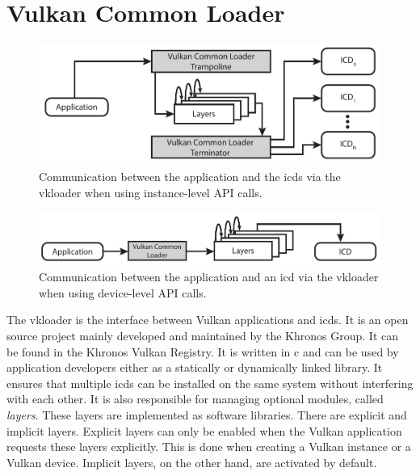   \section{Vulkan Common Loader}
  \label{sec:VulkanLoader}

    \begin{figure}
      \includegraphics{Main/Images/VulkanLoaderInstanceLayers}
      \centering
      \caption{Communication between the application and the \glspl{icd} via the \gls{vkloader} when using instance-level API calls.}
      \label{fig:VulkanLoaderWithInstanceLayers}
    \end{figure}

    \begin{figure}
      \includegraphics{Main/Images/VulkanLoaderDeviceLayers}
      \centering
      \caption{Communication between the application and an \gls{icd} via the \gls{vkloader} when using device-level API calls.}
      \label{fig:VulkanLoaderWithDeviceLayers}
    \end{figure}

    The \gls{vkloader} is the interface between Vulkan applications and \glspl{icd}.
    It is an open source project mainly developed and maintained by the Khronos Group.
    It can be found in the Khronos Vulkan Registry\cite{vulkanregistry}.
    It is written in \gls{c} and can be used by application developers either as a statically or dynamically linked library.
    It ensures that multiple \glspl{icd} can be installed on the same system without interfering with each other.
    It is also responsible for managing optional modules, called \textit{layers}.
    These layers are implemented as software libraries.
    There are explicit and implicit layers.
    Explicit layers can only be enabled when the Vulkan application requests these layers explicitly.
    This is done when creating a Vulkan instance or a Vulkan device.
    Implicit layers, on the other hand, are activated by default.


